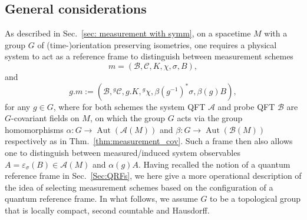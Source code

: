 \documentclass[sn-mathphys-num]{sn-jnl}%
\newcommand{\Af}{\mathscr{A}}
\newcommand{\Bf}{\mathscr{B}}
\newcommand{\Cf}{\mathscr{C}}
\DeclareMathOperator{\Aut}{Aut}
\numberwithin{equation}{section}
\theoremstyle{thmstyleone}%
\theoremstyle{thmstyletwo}%
\theoremstyle{thmstylethree}%
\begin{document}
\subsection{General considerations}
\label{sec:qrf_measurement_general}


As described in Sec.\ \ref{sec: measurement with symm}, on a spacetime $M$ with a group $G$ of (time-)orientation preserving isometries, one requires a physical system to act as a reference frame to distinguish between measurement schemes 
\begin{equation}
    m=(\Bf,\Cf,K,\chi,\sigma, B),
\end{equation} and 
\begin{equation}
    g.m:=(\Bf,\allowbreak{}^g\Cf,g.K,\allowbreak{}^g\chi,\allowbreak\beta(g^{-1})^*\sigma,\allowbreak\beta(g)B),
\end{equation} for any $g\in G$, where for both schemes the system QFT $\Af$ and probe QFT $\Bf$ are $G$-covariant fields on $M$, on which the group $G$ acts via the group homomorphisms $\alpha:G\to \Aut(\Af(M))$ and $\beta:G\to \Aut(\Bf(M))$ respectively as in Thm.~\ref{thm:measurement_cov}. Such a frame then also allows one to distinguish between measured/induced system observables $A=\varepsilon_\sigma(B)\in\Af(M)$ and $\alpha(g)A$. Having recalled the notion of a quantum reference frame in Sec.\ \ref{Sec:QRFs}, we here give a more operational description of the idea of selecting measurement schemes based on the configuration of a quantum reference frame.
In what follows, we assume $G$ to be a topological group that is locally compact, second countable and Hausdorff.
\end{document}
